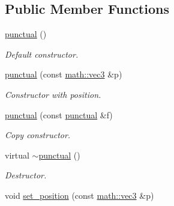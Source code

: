 \subsection*{Public Member Functions}
\begin{DoxyCompactItemize}
\item 
\hyperlink{classphysim_1_1fields_1_1punctual_acd56bc75a1b617501190a427beefbc25}{punctual} ()
\begin{DoxyCompactList}\small\item\em Default constructor. \end{DoxyCompactList}\item 
\mbox{\label{classphysim_1_1fields_1_1punctual_ae72780017547f2b39a143e2234e53e60}} 
\hyperlink{classphysim_1_1fields_1_1punctual_ae72780017547f2b39a143e2234e53e60}{punctual} (const \hyperlink{structphysim_1_1math_1_1vec3}{math\+::vec3} \&p)
\begin{DoxyCompactList}\small\item\em Constructor with position. \end{DoxyCompactList}\item 
\mbox{\label{classphysim_1_1fields_1_1punctual_abb193f2b247fad09ed253ef6ea4a49e9}} 
\hyperlink{classphysim_1_1fields_1_1punctual_abb193f2b247fad09ed253ef6ea4a49e9}{punctual} (const \hyperlink{classphysim_1_1fields_1_1punctual}{punctual} \&f)
\begin{DoxyCompactList}\small\item\em Copy constructor. \end{DoxyCompactList}\item 
\mbox{\label{classphysim_1_1fields_1_1punctual_a11079e528b5db0d18336f29c3fad0177}} 
virtual \hyperlink{classphysim_1_1fields_1_1punctual_a11079e528b5db0d18336f29c3fad0177}{$\sim$punctual} ()
\begin{DoxyCompactList}\small\item\em Destructor. \end{DoxyCompactList}\item 
\mbox{\label{classphysim_1_1fields_1_1punctual_a3d979184b5ed98a989dcabd7124b7db7}} 
void \hyperlink{classphysim_1_1fields_1_1punctual_a3d979184b5ed98a989dcabd7124b7db7}{set\+\_\+position} (const \hyperlink{structphysim_1_1math_1_1vec3}{math\+::vec3} \&p)

\end{DoxyCompactItemize}
